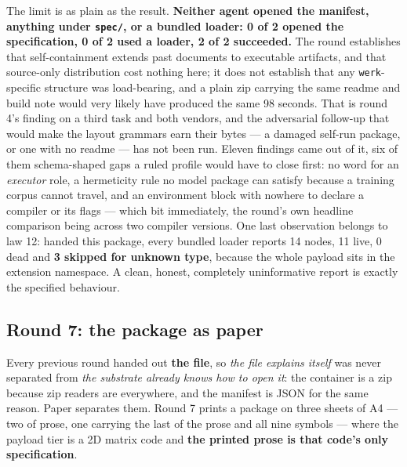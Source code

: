 \documentclass[10pt,twocolumn,letterpaper]{article}
\newcommand{\code}[1]{\texttt{\small #1}}
\begin{document}
The limit is as plain as the result. \textbf{Neither agent opened the manifest, anything under \code{spec/}, or a bundled loader: 0 of 2 opened the specification, 0 of 2 used a loader, 2 of 2 succeeded.} The round establishes that self-containment extends past documents to executable artifacts, and that source-only distribution cost nothing here; it does not establish that any \code{werk}-specific structure was load-bearing, and a plain zip carrying the same readme and build note would very likely have produced the same 98 seconds. That is round 4's finding on a third task and both vendors, and the adversarial follow-up that would make the layout grammars earn their bytes --- a damaged self-run package, or one with no readme --- has not been run. Eleven findings came out of it, six of them schema-shaped gaps a ruled profile would have to close first: no word for an \emph{executor} role, a hermeticity rule no model package can satisfy because a training corpus cannot travel, and an environment block with nowhere to declare a compiler or its flags --- which bit immediately, the round's own headline comparison being across two compiler versions. One last observation belongs to law 12: handed this package, every bundled loader reports 14 nodes, 11 live, 0 dead and \textbf{3 skipped for unknown type}, because the whole payload sits in the extension namespace. A clean, honest, completely uninformative report is exactly the specified behaviour.

\subsection{Round 7: the package as paper}

Every previous round handed out \textbf{the file}, so \emph{the file explains itself} was never separated from \emph{the substrate already knows how to open it}: the container is a zip because zip readers are everywhere, and the manifest is JSON for the same reason. Paper separates them. Round 7 prints a package on three sheets of A4 --- two of prose, one carrying the last of the prose and all nine symbols --- where the payload tier is a 2D matrix code and \textbf{the printed prose is that code's only specification}.
\end{document}
